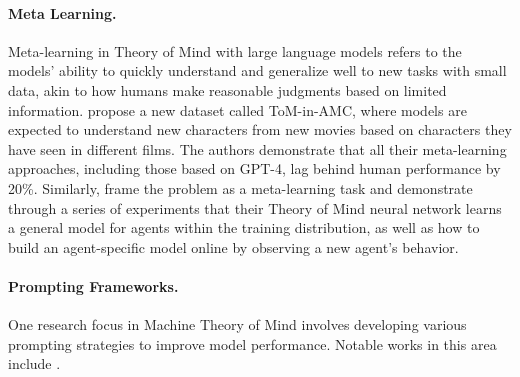 \paragraph{Meta Learning.}
Meta-learning in Theory of Mind with large language models refers to the models' ability to quickly understand and generalize well to new tasks with small data, akin to how humans make reasonable judgments based on limited information. \citet{yu2024fewshotcharacterunderstandingmovies} propose a new dataset called ToM-in-AMC, where models are expected to understand new characters from new movies based on characters they have seen in different films. The authors demonstrate that all their meta-learning approaches, including those based on GPT-4, lag behind human performance by 20\%. Similarly, \citet{rabinowitz2018machinetheorymind} frame the problem as a meta-learning task and demonstrate through a series of experiments that their Theory of Mind neural network learns a general model for agents within the training distribution, as well as how to build an agent-specific model online by observing a new agent’s behavior.

\paragraph{Prompting Frameworks.}
One research focus in Machine Theory of Mind involves developing various prompting strategies to improve model performance. Notable works in this area include \citet{wilf2023thinktwiceperspectivetakingimproves, hou-etal-2024-timetom, jung2024perceptionsbeliefsexploringprecursory, zhou2023farlargelanguagemodels, xu2024faithfullogicalreasoningsymbolic,wang2024metacognitivepromptingimprovesunderstanding, huang2024notioncomplexitytheorymind}.